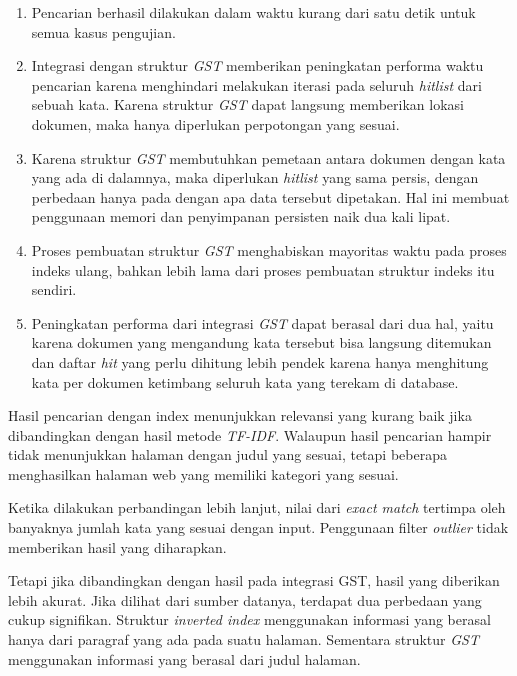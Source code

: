 \begin{enumerate}
  \item{Pencarian berhasil dilakukan dalam waktu kurang dari satu detik untuk 
    semua kasus pengujian.}
  \item{Integrasi dengan struktur \textit{GST} memberikan peningkatan performa 
    waktu pencarian karena menghindari melakukan iterasi pada seluruh
    \textit{hitlist} dari sebuah kata. Karena struktur \textit{GST} dapat 
    langsung memberikan lokasi dokumen, maka hanya diperlukan perpotongan yang 
    sesuai.}
  \item{Karena struktur \textit{GST} membutuhkan pemetaan antara dokumen dengan 
    kata yang ada di dalamnya, maka diperlukan \textit{hitlist} yang sama 
    persis, dengan perbedaan hanya pada dengan apa data tersebut dipetakan. Hal 
    ini membuat penggunaan memori dan penyimpanan persisten naik dua kali lipat.}
  \item{Proses pembuatan struktur \textit{GST} menghabiskan mayoritas waktu pada 
    proses indeks ulang, bahkan lebih lama dari proses pembuatan struktur indeks 
    itu sendiri.}
  \item{Peningkatan performa dari integrasi \textit{GST} dapat berasal dari dua 
    hal, yaitu karena dokumen yang mengandung kata tersebut bisa langsung 
    ditemukan dan daftar \textit{hit} yang perlu dihitung lebih pendek karena 
    hanya menghitung kata per dokumen ketimbang seluruh kata yang terekam di 
    database.}
\end{enumerate}

Hasil pencarian dengan index menunjukkan relevansi yang kurang baik jika 
dibandingkan dengan hasil metode \textit{TF-IDF}. Walaupun hasil pencarian 
hampir tidak menunjukkan halaman dengan judul yang sesuai, tetapi beberapa 
menghasilkan halaman web yang memiliki kategori yang sesuai.

Ketika dilakukan perbandingan lebih lanjut, nilai dari \textit{exact match} 
tertimpa oleh banyaknya jumlah kata yang sesuai dengan input. Penggunaan filter 
\textit{outlier} tidak memberikan hasil yang diharapkan.

Tetapi jika dibandingkan dengan hasil pada integrasi GST, hasil yang diberikan 
lebih akurat. Jika dilihat dari sumber datanya, terdapat dua perbedaan yang 
cukup signifikan. Struktur \textit{inverted index} menggunakan informasi yang 
berasal hanya dari paragraf yang ada pada suatu halaman. Sementara struktur
\textit{GST} menggunakan informasi yang berasal dari judul halaman.

